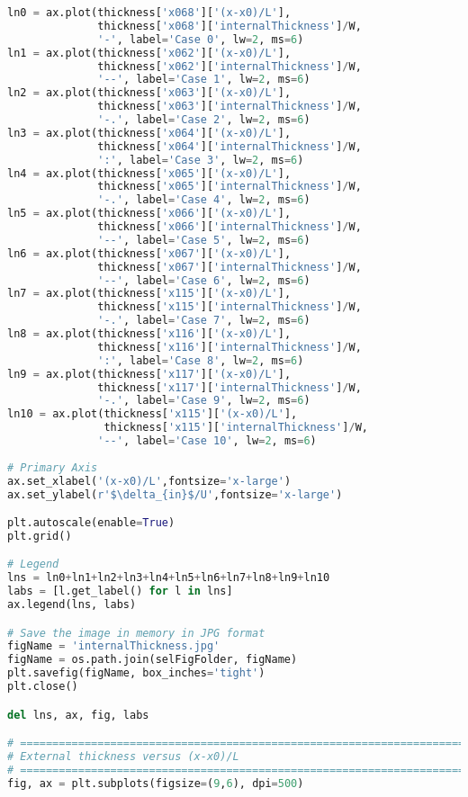 \begin{lstlisting}[language=python]
ln0 = ax.plot(thickness['x068']['(x-x0)/L'],
              thickness['x068']['internalThickness']/W,
              '-', label='Case 0', lw=2, ms=6)
ln1 = ax.plot(thickness['x062']['(x-x0)/L'],
              thickness['x062']['internalThickness']/W,
              '--', label='Case 1', lw=2, ms=6)
ln2 = ax.plot(thickness['x063']['(x-x0)/L'],
              thickness['x063']['internalThickness']/W,
              '-.', label='Case 2', lw=2, ms=6)
ln3 = ax.plot(thickness['x064']['(x-x0)/L'],
              thickness['x064']['internalThickness']/W,
              ':', label='Case 3', lw=2, ms=6)
ln4 = ax.plot(thickness['x065']['(x-x0)/L'],
              thickness['x065']['internalThickness']/W,
              '-.', label='Case 4', lw=2, ms=6)
ln5 = ax.plot(thickness['x066']['(x-x0)/L'],
              thickness['x066']['internalThickness']/W,
              '--', label='Case 5', lw=2, ms=6)
ln6 = ax.plot(thickness['x067']['(x-x0)/L'],
              thickness['x067']['internalThickness']/W,
              '--', label='Case 6', lw=2, ms=6)
ln7 = ax.plot(thickness['x115']['(x-x0)/L'],
              thickness['x115']['internalThickness']/W,
              '-.', label='Case 7', lw=2, ms=6)
ln8 = ax.plot(thickness['x116']['(x-x0)/L'],
              thickness['x116']['internalThickness']/W,
              ':', label='Case 8', lw=2, ms=6)
ln9 = ax.plot(thickness['x117']['(x-x0)/L'],
              thickness['x117']['internalThickness']/W,
              '-.', label='Case 9', lw=2, ms=6)
ln10 = ax.plot(thickness['x115']['(x-x0)/L'],
               thickness['x115']['internalThickness']/W,
              '--', label='Case 10', lw=2, ms=6)
    
# Primary Axis
ax.set_xlabel('(x-x0)/L',fontsize='x-large')
ax.set_ylabel(r'$\delta_{in}$/U',fontsize='x-large')

plt.autoscale(enable=True)
plt.grid()

# Legend
lns = ln0+ln1+ln2+ln3+ln4+ln5+ln6+ln7+ln8+ln9+ln10
labs = [l.get_label() for l in lns]
ax.legend(lns, labs)

# Save the image in memory in JPG format
figName = 'internalThickness.jpg'
figName = os.path.join(selFigFolder, figName)
plt.savefig(figName, box_inches='tight')
plt.close()

del lns, ax, fig, labs

# =============================================================================
# External thickness versus (x-x0)/L
# =============================================================================
fig, ax = plt.subplots(figsize=(9,6), dpi=500)


\end{lstlisting}
